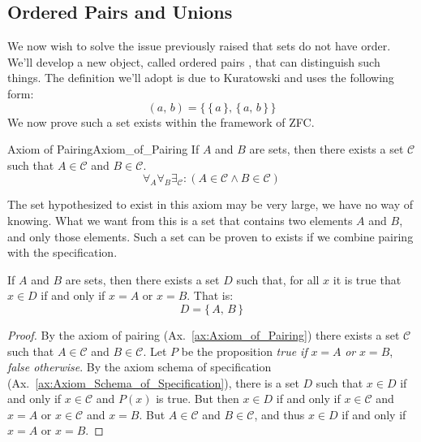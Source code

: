     \subsection{Ordered Pairs and Unions}
        We now wish to solve the issue previously raised that sets do
        not have order. We'll develop a new object, called ordered pairs%
        , that can distinguish such things. The definition
        we'll adopt is due to Kuratowski and uses
        the following form:
        \begin{equation}
            (a,\,b)=\Big\{\,\big\{\,a\,\big\},\,\big\{\,a,\,b\,\big\}\,\Big\}
        \end{equation}
        We now prove such a set exists within the framework of ZFC.
        \begin{faxiom}{Axiom of Pairing}{Axiom_of_Pairing}
            If $A$ and $B$ are sets, then there exists a set $\mathcal{C}$
            such that $A\in\mathcal{C}$ and $B\in\mathcal{C}$.
            \begin{equation*}
                \forall_{A}\forall_{B}\exists_{\mathcal{C}}:
                (A\in\mathcal{C}\land{B}\in\mathcal{C})
            \end{equation*}
        \end{faxiom}
        The set hypothesized to exist in this axiom may be very large, we have
        no way of knowing. What we want from this is a set that contains two
        elements $A$ and $B$, and only those elements. Such a set can be proven
        to exists if we combine pairing with the specification.
        \begin{theorem}
            \label{thm:Existence_of_Set_Built_from_Two_Sets}%
            If $A$ and $B$ are sets, then there exists a set $D$ such that,
            for all $x$ it is true that $x\in{D}$ if and only if $x=A$ or
            $x=B$. That is:
            \begin{equation}
                D=\{\,A,\,B\,\}
            \end{equation}
        \end{theorem}
        \begin{proof}
            By the axiom of pairing (Ax.~\ref{ax:Axiom_of_Pairing}) there
            exists a set $\mathcal{C}$ such that $A\in\mathcal{C}$ and
            $B\in\mathcal{C}$. Let $P$ be the proposition
            \textit{true if} $x=A$ \textit{or} $x=B$, \textit{false otherwise}.
            By the axiom schema of specification
            (Ax.~\ref{ax:Axiom_Schema_of_Specification}), there is a set
            $D$ such that $x\in{D}$ if and only if $x\in\mathcal{C}$ and
            $P(x)$ is true. But then $x\in{D}$ if and only if
            $x\in\mathcal{C}$ and $x=A$ or $x\in\mathcal{C}$ and $x=B$.
            But $A\in\mathcal{C}$ and $B\in\mathcal{C}$, and thus
            $x\in{D}$ if and only if $x=A$ or $x=B$.
        \end{proof}
